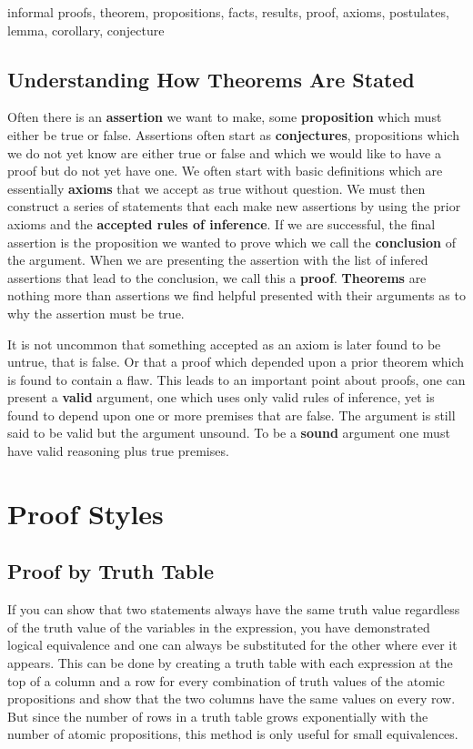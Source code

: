 \documentclass[11pt]{book} %
\theoremstyle {definition}
\theoremstyle {remark}
\begin{document}
    informal proofs, theorem, propositions, facts, results, proof, axioms, postulates, lemma, corollary, conjecture
    \subsection {Understanding How Theorems Are Stated}
Often there is an \textbf{assertion} we want to make, some \textbf{proposition} which must either be true or false. Assertions often start as \textbf{conjectures}, propositions which we do not yet know are either true or false and which we would like to have a proof but do not yet have one. We often start with basic definitions which are essentially \textbf{axioms} that we accept as true without question. We must then construct a series of statements that each make new assertions by using the prior axioms and the \textbf{accepted rules of inference}. If we are successful, the final assertion is the proposition we wanted to prove which we call the \textbf{conclusion} of the argument. When we are presenting the assertion with the list of infered assertions that lead to the conclusion, we call this a \textbf{proof}. \textbf{Theorems} are nothing more than assertions we find helpful presented with their arguments as to why the assertion must be true. 

It is not uncommon that something accepted as an axiom is later found to be untrue, that is false. Or that a proof which depended upon a prior theorem which is found to contain a flaw. This leads to an important point about proofs, one can present a \textbf{valid} argument, one which uses only valid rules of inference, yet is found to depend upon one or more premises that are false. The argument is still said to be valid but the argument unsound. To be a \textbf{sound} argument one must have valid reasoning plus true premises. 

\section{Proof Styles}
  \subsection{Proof by Truth Table}
If you can show that two statements always have the same truth value regardless of the truth value of the variables in the expression, you have demonstrated logical equivalence and one can always be substituted for the other where ever it appears. This can be done by creating a truth table with each expression at the top of a column and a row for every combination of truth values of the atomic propositions and show that the two columns have the same values on every row. But since the number of rows in a truth table grows exponentially with the number of atomic propositions, this method is only useful for small equivalences.
\end{document}

